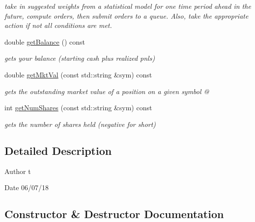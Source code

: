 \begin{DoxyCompactItemize}
\begin{DoxyCompactList}\small\item\em take in suggested weights from a statistical model for one time period ahead in the future, compute orders, then submit orders to a queue. Also, take the appropriate action if not all conditions are met. \end{DoxyCompactList}\item 
double \hyperlink{classPortfolio_aba2f09887f0859f9407cb961c10f0fef}{get\+Balance} () const
\begin{DoxyCompactList}\small\item\em gets your balance (starting cash plus realized pnls) \end{DoxyCompactList}\item 
double \hyperlink{classPortfolio_aca678d7a74e62ea9fa30843685585b48}{get\+Mkt\+Val} (const std\+::string \&sym) const
\begin{DoxyCompactList}\small\item\em gets the outstanding market value of a position on a given symbol @ \end{DoxyCompactList}\item 
int \hyperlink{classPortfolio_a4362d4cfc98f8cf060e611a74b91673a}{get\+Num\+Shares} (const std\+::string \&sym) const
\begin{DoxyCompactList}\small\item\em gets the number of shares held (negative for short) \end{DoxyCompactList}\end{DoxyCompactItemize}


\subsection{Detailed Description}
\begin{DoxyAuthor}{Author}
t 
\end{DoxyAuthor}
\begin{DoxyDate}{Date}
06/07/18 
\end{DoxyDate}


\subsection{Constructor \& Destructor Documentation}
\mbox{\label{classPortfolio_a06e9aac5ff020a789dcdeba2718f11b5}} 
